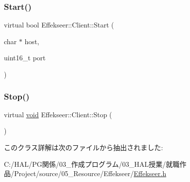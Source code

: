 \subsubsection{\texorpdfstring{Start()}{Start()}}
{\footnotesize\ttfamily virtual bool Effekseer\+::\+Client\+::\+Start (\begin{DoxyParamCaption}\item[{char $\ast$}]{host,  }\item[{uint16\+\_\+t}]{port }\end{DoxyParamCaption})\hspace{0.3cm}{\ttfamily [pure virtual]}}

\mbox{\label{class_effekseer_1_1_client_aa490dfe72eeb567e6eff19d9e8b850c1}} 
\subsubsection{\texorpdfstring{Stop()}{Stop()}}
{\footnotesize\ttfamily virtual \mbox{\hyperlink{namespace_effekseer_ab34c4088e512200cf4c2716f168deb56}{void}} Effekseer\+::\+Client\+::\+Stop (\begin{DoxyParamCaption}{ }\end{DoxyParamCaption})\hspace{0.3cm}{\ttfamily [pure virtual]}}



このクラス詳解は次のファイルから抽出されました\+:\begin{DoxyCompactItemize}
\item 
C\+:/\+H\+A\+L/\+P\+G関係/03\+\_\+作成プログラム/03\+\_\+\+H\+A\+L授業/就職作品/\+Project/source/05\+\_\+\+Resource/\+Effekseer/\mbox{\hyperlink{_effekseer_8h}{Effekseer.\+h}}\end{DoxyCompactItemize}
